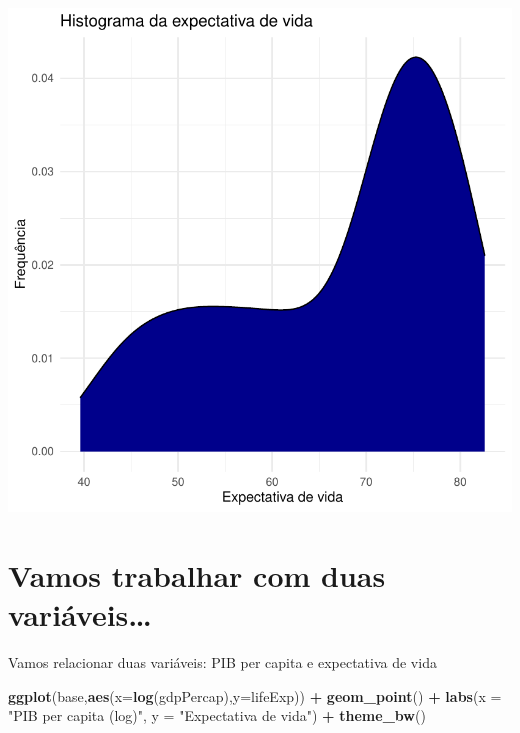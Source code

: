 \documentclass[
]{article}
\newenvironment{Shaded}{\begin{snugshade}}{\end{snugshade}}
\newcommand{\DataTypeTok}[1]{\textcolor[rgb]{0.13,0.29,0.53}{#1}}
\newcommand{\KeywordTok}[1]{\textcolor[rgb]{0.13,0.29,0.53}{\textbf{#1}}}
\newcommand{\NormalTok}[1]{#1}
\newcommand{\OperatorTok}[1]{\textcolor[rgb]{0.81,0.36,0.00}{\textbf{#1}}}
\newcommand{\StringTok}[1]{\textcolor[rgb]{0.31,0.60,0.02}{#1}}
\begin{document}
\begin{center}\includegraphics{arquivo_pdf_files/figure-latex/densidade customizada-1} \end{center}

\hypertarget{vamos-trabalhar-com-duas-variuxe1veis}{%
\section{Vamos trabalhar com duas
variáveis\ldots{}}\label{vamos-trabalhar-com-duas-variuxe1veis}}

Vamos relacionar duas variáveis: PIB per capita e expectativa de vida

\begin{Shaded}
\begin{Highlighting}[]
\KeywordTok{ggplot}\NormalTok{(base,}\KeywordTok{aes}\NormalTok{(}\DataTypeTok{x=}\KeywordTok{log}\NormalTok{(gdpPercap),}\DataTypeTok{y=}\NormalTok{lifeExp)) }\OperatorTok{+}\StringTok{ }\KeywordTok{geom_point}\NormalTok{() }\OperatorTok{+}
\StringTok{  }\KeywordTok{labs}\NormalTok{(}\DataTypeTok{x =} \StringTok{"PIB per capita (log)"}\NormalTok{, }\DataTypeTok{y =} \StringTok{"Expectativa de vida"}\NormalTok{) }\OperatorTok{+}\StringTok{ }\KeywordTok{theme_bw}\NormalTok{()}
\end{Highlighting}
\end{Shaded}
\end{document}
